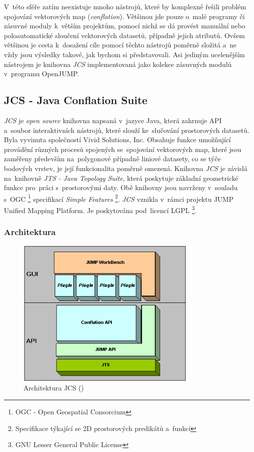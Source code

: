 V~této sféře zatím neexistuje mnoho nástrojů, které by komplexně řešili problém
spojování vektorových map (\textit{conflation}). Většinou jde pouze o~malé 
programy či zásuvné moduly k~větším projektům, pomocí nichž se dá provést manuální
nebo poloautomatické sloučení vektorových datasetů, případně jejich atributů. 
Ovšem většinou je cesta k~dosažení cíle pomocí těchto nástrojů poměrně složitá 
a~ne vždy jsou výsledky takové, jak bychom si představovali. Asi jediným 
ucelenějším nástrojem je knihovna \textit{JCS} implementovaná jako kolekce 
zásuvných modulů v~programu OpenJUMP.

\subsection{JCS - Java Conflation Suite}
\label{JCS}

\textit{JCS} je \textit{open source} knihovna napsaná v~jazyce Java, která 
zahrnuje API a~soubor interaktivních nástrojů, které slouží ke~slučování 
prostorových datasetů. Byla vyvinuta společností Vivid Solutions, Inc. 
Obsahuje funkce umožňující provádění různých procesů spojených se~spojování
vektorových map, které jsou zaměřeny především na~polygonové případně liniové
datasety, co se týče bodových vrstev, je její funkcionalita poměrně omezená. 
Knihovna \textit{JCS} je závislá na~knihovně \textit{JTS - Java Topology Suite},
která poskytuje základní geometrické funkce pro~práci s~prostorovými
daty. Obě knihovny jsou navrženy v~souladu s~OGC \footnote{OGC - Open Geospatial
Consorcium} specifikací \textit{Simple Features} \footnote{Specifikace týkající
se 2D prostorových predikátů a~funkcí}. \textit{JCS} vznikla v~rámci projektu 
JUMP Unified Mapping Platform. Je poskytována pod~licencí LGPL \footnote{GNU
Lesser General Public License}.

\subsubsection{Architektura}
\label{jcspic}
  \begin{figure}[hbt]
    \centering
      \includegraphics[width=250pt]{./pictures/JCS_Architecture.png}
      \caption{Architektura JCS 
	  ()}
      \label{fig:architektura}
  \end{figure}


